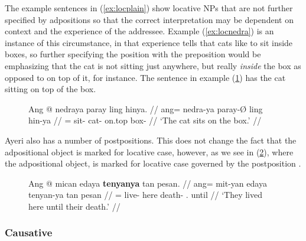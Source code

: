 The example sentences in (\ref{ex:locplain}) show locative NPs that are not
further specified by adpositions so that the correct interpretation may be
dependent on context and the experience of the addressee. Example
(\ref{ex:locnedra}) is an instance of this circumstance, in that experience
tells that cats like to sit inside boxes, so further specifying the position
with the preposition  would be emphasizing that the
cat is not sitting just anywhere, but really \emph{inside} the box as opposed
to on top of it, for instance. The sentence in example (\ref{ex:expladp}) has
the cat sitting on top of the box.

\begin{figure}[h]
\ex\label{ex:expladp}
\begingl
	\gla Ang @ nedraya paray ling hinya. //
	\glb ang= nedra-ya paray-Ø ling hin-ya //
	\glc \AgtT{}= sit-\TsgM{} cat-\Top{} on.top box-\Loc{} //
	\glft `The cat sits on the box.' //
\endgl\xe
\end{figure}

Ayeri also has a number of postpositions. This does not change the fact that
the adpositional object is marked for locative case, however, as we see in
(\ref{ex:locpostpos}), where the adpositional object,
 is marked for locative case governed by the
postposition .

\begin{figure}[h]
\ex\label{ex:locpostpos}%
\begingl
	\gla Ang @ mican edaya \textbf{tenyanya} tan pesan. //
	\glb ang= mit-yan edaya tenyan-ya tan pesan //
	\glc \AgtT{}= live-\TplM{} here death-\Loc{} \TplM{}.\Gen{} until //
	\glft `They lived here until their death.' //
\endgl\xe
\end{figure}


\subsubsection{Causative}
\label{subsubsec:causative}

